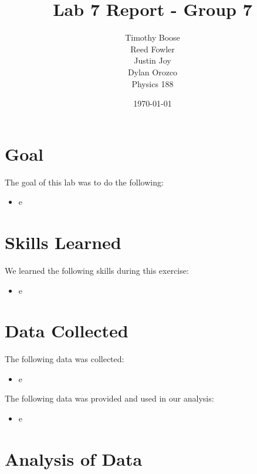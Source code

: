 \documentclass{article}
\author{Timothy Boose\\Reed Fowler\\Justin Joy\\Dylan Orozco\bigskip\\Physics 188}
\date{\today}
\title{Lab 7 Report - Group 7}
\begin{document}
\maketitle

\section{Goal}

The goal of this lab was to do the following:

\begin{itemize}
    \item e
\end{itemize}

\section{Skills Learned}

We learned the following skills during this exercise:

\begin{itemize}
    \item e
\end{itemize}

\section{Data Collected}

The following data was collected:

\begin{itemize}
    \item e
\end{itemize}

The following data was provided and used in our analysis:

\begin{itemize}
    \item e
\end{itemize}

\section{Analysis of Data}
\end{document}
